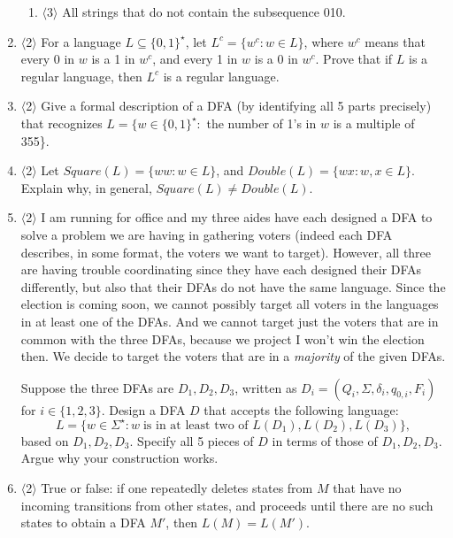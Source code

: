 \documentclass[]{article}
\newcommand{\Level}[1]{{\color{blue} $\langle$#1$\rangle$}}
\begin{document}
\begin{enumerate}
\begin{enumerate}
\item \Level{3} All strings that do not contain the subsequence 010.

\end{enumerate}

\item \Level{2} For a language $L \subseteq \{0,1\}^\star$, let $L^c = \{w^c : w \in L\}$, where $w^c$ means that every 0 in $w$ is a 1 in $w^c$, and every 1 in $w$ is a 0 in $w^c$.
Prove that if $L$ is a regular language, then $L^c$ is a regular language.

\item \Level{2} Give a formal description of a DFA (by identifying all 5 parts precisely) that recognizes $L = \{w \in \{0,1\}^\star :$ the number of 1's in $w$ is a multiple of 355\}.

\item  \label{ex2017fsquaredouble} \Level{2} Let $Square(L) = \{ ww : w \in L\}$, and $Double(L) = \{wx : w, x \in L \}$.
Explain why, in general, $Square(L) \ne Double(L)$.

\item \Level{2} I am running for office and my three aides have each designed a DFA to solve a problem we are having in gathering voters (indeed each DFA describes, in some format, the voters we want to target).
However, all three are having trouble coordinating since they have each designed their DFAs differently, but also that their DFAs do not have the same language.
Since the election is coming soon, we cannot possibly target all voters in the languages in at least one of the DFAs.
And we cannot target just the voters that are in common with the three DFAs, because we project I won't win the election then.
We decide to target the voters that are in a \textit{majority} of the given DFAs.

Suppose the three DFAs are $D_1, D_2, D_3$, written as $D_i = (Q_i, \Sigma, \delta_i, q_{0,i}, F_i)$ for $i \in \{1,2,3\}$.
Design a DFA $D$ that accepts the following language:
\[
L = \{ w \in \Sigma^\star : w\;\text{is in at least two of $L(D_1), L(D_2), L(D_3)$}\},
\]
based on $D_1, D_2, D_3$.
Specify all 5 pieces of $D$ in terms of those of $D_1, D_2, D_3$.
Argue why your construction works.

\item \Level{2} True or false: if one repeatedly deletes states from $M$ that have no incoming transitions from other states, and proceeds until there are no such states to obtain a DFA $M'$, then $L(M) = L(M')$.


\end{enumerate}
\end{document}
